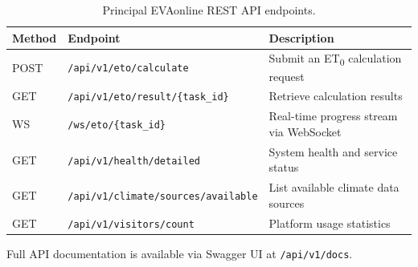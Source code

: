 \documentclass[preprint,review,12pt]{elsarticle}
\begin{document}
\begin{table}[htbp]
\centering
\caption{Principal EVAonline REST API endpoints.}
\label{tab:api}
\small
\begin{tabular}{@{}llp{6.5cm}@{}}
\toprule
Method & Endpoint & Description \\
\midrule
POST & \texttt{/api/v1/eto/calculate} & Submit an ET\textsubscript{0} calculation request \\
GET & \texttt{/api/v1/eto/result/\{task\_id\}} & Retrieve calculation results \\
WS & \texttt{/ws/eto/\{task\_id\}} & Real-time progress stream via WebSocket \\
GET & \texttt{/api/v1/health/detailed} & System health and service status \\
GET & \texttt{/api/v1/climate/sources/available} & List available climate data sources \\
GET & \texttt{/api/v1/visitors/count} & Platform usage statistics \\
\bottomrule
\end{tabular}
\begin{flushleft}
\small Full API documentation is available via Swagger UI at
\texttt{/api/v1/docs}.
\end{flushleft}
\end{table}




\end{document}
